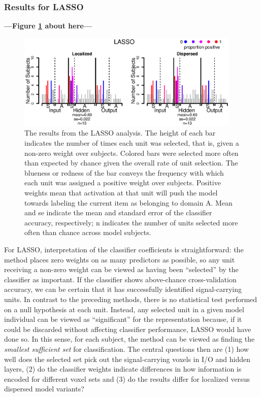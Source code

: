 \subsubsection{Results for LASSO}

\begin{center}
\textbf{---Figure \ref{fig.lasso} about here---}
\end{center}

\begin{figure}
\centering
\includegraphics[width=0.95\textwidth]{figures/figure6.eps}
\caption{The results from the LASSO analysis. The height of each bar indicates the number of times each unit was selected, that is, given a non-zero weight over subjects. Colored bars were selected more often than expected by chance given the overall rate of unit selection. The blueness or redness of the bar conveys the frequency with which each unit was assigned a positive weight over subjects. Positive weights mean that activation at that unit will push the model towards labeling the current item as belonging to domain A. Mean and se indicate the mean and standard error of the classifier accuracy, respectively; n indicates the number of units selected more often than chance across model subjects.}
\label{fig.lasso} 
\end{figure}

For LASSO, interpretation of the classifier coefficients is straightforward: the method places zero weights on as many predictors as possible, so any unit receiving a non-zero weight can be viewed as having been ``selected'' by the classifier as important. If the classifier shows above-chance cross-validation accuracy, we can be certain that it has successfully identified signal-carrying units. In contrast to the preceding methods, there is no statistical test performed on a null hypothesis at each unit. Instead, any selected unit in a given model individual can be viewed as ``significant'' for the representation because, if it could be discarded without affecting classifier performance, LASSO would have done so. In this sense, for each subject, the method can be viewed as finding the {\em smallest sufficient set} for classification. The central questions then are (1) how well does the selected set pick out the signal-carrying voxels in I/O and hidden layers, (2) do the classifier weights indicate differences in how information is encoded for different voxel sets and (3) do the results differ for localized versus dispersed model variants?

